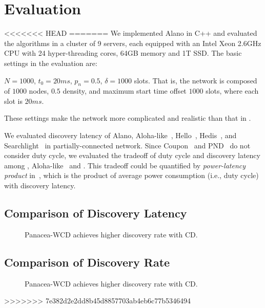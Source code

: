 \section{Evaluation}
\label{Evaluation}

<<<<<<< HEAD
=======
We implemented Alano in C++ and evaluated the algorithms in a cluster of 9 servers, each equipped with an Intel Xeon 2.6GHz CPU with 24 hyper-threading cores, 64GB memory and 1T SSD. The basic settings in the evaluation are: 


$N=1000$, $t_0=20ms$, $p_n=0.5$, $\delta=1000$ slots. That is, the network is composed of $1000$ nodes, $0.5$ density, and maximum start time offset $1000$ slots, where each slot is $20 ms$. 

These settings make the network more complicated and realistic than that in \cite{Kandhalu2010, Sun2014b, Qiu2016, Chen2015, Bakht2012, McGlynn2001, Vasudevan2009, Jiang2005, Dutta2008, You2011, Song2014}.

We evaluated discovery latency of Alano, Aloha-like~\cite{You2011}, Hello~\cite{Sun2014b}, Hedis~\cite{}, and Searchlight~\cite{} in partially-connected network. Since Coupon~\cite{Vasudevan2009} and PND~\cite{Song2014} do not consider duty cycle, we evaluated the tradeoff of duty cycle and discovery latency among \Panacea, Aloha-like~\cite{You2011} and .
This tradeoff could be quantified by \emph{power-latency product} in~\cite{Kandhalu2010}, which is the product of average power consumption (i.e., duty cycle) with discovery latency.

\subsection{Comparison of Discovery Latency}
\begin{figure}[!t]
\centering
{}
\hspace{0.01in}
\caption{Panacea-WCD achieves higher discovery rate with CD.}
\label{fig_timerate}
\end{figure}

\subsection{Comparison of Discovery Rate}

\begin{figure}[!t]
\centering
{}
\hspace{0.01in}
\caption{Panacea-WCD achieves higher discovery rate with CD.}
\label{fig_timerate}
\end{figure}


>>>>>>> 7e382d2e2dd8b45d8857703ab4eb6c77b5346494
